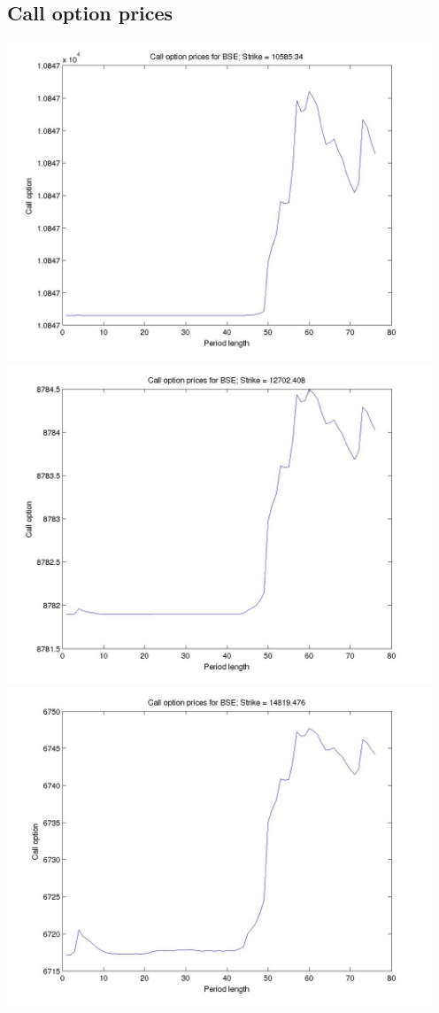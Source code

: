 \documentclass[12pt]{article}
\begin{document}
  \subsection{Call option prices}
    \begin{center}
      \includegraphics[width=5in]{call_strike1.jpg}
      \includegraphics[width=5in]{call_strike2.jpg}
      \includegraphics[width=5in]{call_strike3.jpg}

\end{center}
\end{document}
